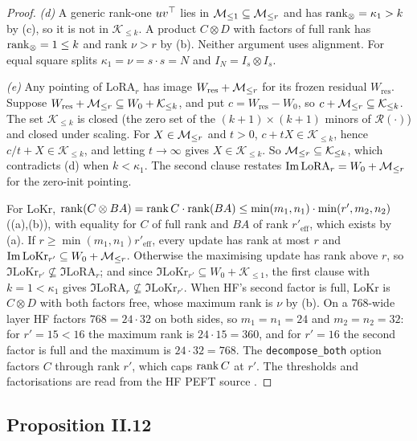 \begin{proof}
\emph{(d)} A generic rank-one $uv^{\top}$ lies in $\mathcal{M}_{\le1}\subseteq\mathcal{M}_{\le r}$ and has $\operatorname{rank}_\otimes=\kappa_1>k$ by (c), so it is not in
$\mathcal K_{\le k}$. A product $C\otimes D$ with factors of full rank has $\operatorname{rank}_\otimes=1\le k$ and rank $\nu>r$ by (b). Neither
argument uses alignment. For equal square splits $\kappa_1=\nu=s\cdot s=N$ and $I_N=I_s\otimes I_s$.

\emph{(e)} Any pointing of $\mathrm{LoRA}_r$ has image $W_{\mathrm{res}}+\mathcal{M}_{\le r}$ for its frozen residual $W_{\mathrm{res}}$.
Suppose $W_{\mathrm{res}}+\mathcal{M}_{\le r}\subseteq W_0+\mathcal K_{\le k}$, and put $c=W_{\mathrm{res}}-W_0$, so $c+\mathcal{M}_{\le r}\subseteq\mathcal
K_{\le k}$. The set $\mathcal K_{\le k}$ is closed (the zero set of the $(k+1)\times(k+1)$ minors of $\mathcal R(\cdot)$) and
closed under scaling. For $X\in\mathcal{M}_{\le r}$ and $t>0$, $c+tX\in\mathcal K_{\le k}$, hence $c/t+X\in\mathcal K_{\le k}$, and letting
$t\to\infty$ gives $X\in\mathcal K_{\le k}$. So $\mathcal{M}_{\le r}\subseteq\mathcal K_{\le k}$, which contradicts (d) when $k<\kappa_1$.
The second clause restates $\operatorname{Im}\mathrm{LoRA}_r=W_0+\mathcal{M}_{\le r}$ for the zero-init pointing.

For LoKr, $\operatorname{rank}(C\otimes BA)=\operatorname{rank} C\cdot\operatorname{rank}(BA)\le\min(m_1,n_1)\cdot\min(r',m_2,n_2)$ ((a),(b)), with equality
for $C$ of full rank and $BA$ of rank $r'_{\mathrm{eff}}$, which exists by (a). If
$r\ge\min(m_1,n_1)r'_{\mathrm{eff}}$, every update has rank at most $r$ and $\operatorname{Im}\mathrm{LoKr}_{r'}\subseteq W_0+\mathcal{M}_{\le r}$.
Otherwise the maximising update has rank above $r$, so $\Im\mathrm{LoKr}_{r'}\not\subseteq\Im\mathrm{LoRA}_r$; and since
$\Im\mathrm{LoKr}_{r'}\subseteq W_0+\mathcal K_{\le1}$, the first clause with $k=1<\kappa_1$ gives
$\Im\mathrm{LoRA}_r\not\subseteq\Im\mathrm{LoKr}_{r'}$. When HF's second factor is full, LoKr is $C\otimes D$ with both
factors free, whose maximum rank is $\nu$ by (b). On a $768$-wide layer HF factors $768=24\cdot32$ on both sides, so
$m_1=n_1=24$ and $m_2=n_2=32$: for $r'=15<16$ the maximum rank is $24\cdot15=360$, and for $r'=16$ the second factor is full and
the maximum is $24\cdot32=768$. The \texttt{decompose\_both} option factors $C$ through rank $r'$, which caps $\operatorname{rank} C$ at $r'$.
The thresholds and factorisations are read from the HF PEFT source \citep{xmangrulkar2022peft}.
\end{proof}

\subsection{Proposition II.12}\label{proof:II.12}


